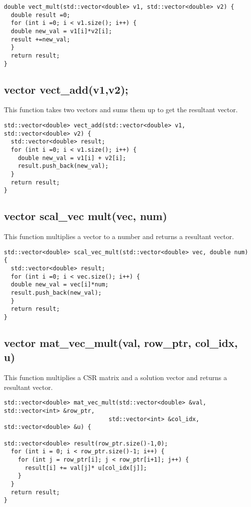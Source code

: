 \documentclass{article}
\begin{document}
 \begin{verbatim}
double vect_mult(std::vector<double> v1, std::vector<double> v2) {
  double result =0;
  for (int i =0; i < v1.size(); i++) {
  double new_val = v1[i]*v2[i];
  result +=new_val;
  }
  return result; 
}
\end{verbatim}

\subsection{vector vect\_add(v1,v2);}
This function takes two vectors and sums them up to get the resultant vector.

 \begin{verbatim}
std::vector<double> vect_add(std::vector<double> v1, std::vector<double> v2) {
  std::vector<double> result;
  for (int i =0; i < v1.size(); i++) {
    double new_val = v1[i] + v2[i];
    result.push_back(new_val);
  }
  return result;
}
\end{verbatim}

\subsection{vector scal\_vec mult(vec, num)}
This function multiplies a vector to a number and returns a resultant vector.

 \begin{verbatim}
std::vector<double> scal_vec_mult(std::vector<double> vec, double num) {
  std::vector<double> result;
  for (int i =0; i < vec.size(); i++) {
  double new_val = vec[i]*num;
  result.push_back(new_val);
  }
  return result; 
}
\end{verbatim}

\subsection{vector mat\_vec\_mult(val, row\_ptr, col\_idx, u)}
This function multiplies a CSR matrix and a solution vector and returns a resultant vector.

 \begin{verbatim}
std::vector<double> mat_vec_mult(std::vector<double> &val, std::vector<int> &row_ptr,
                              std::vector<int> &col_idx, std::vector<double> &u) {
  
std::vector<double> result(row_ptr.size()-1,0);
  for (int i = 0; i < row_ptr.size()-1; i++) {
    for (int j = row_ptr[i]; j < row_ptr[i+1]; j++) {
      result[i] += val[j]* u[col_idx[j]];
    }
  }
  return result;
}
\end{verbatim}
\end{document}
